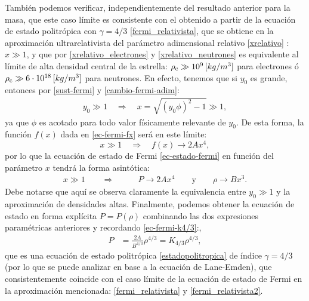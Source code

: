 También podemos verificar, independientemente del resultado anterior para la masa, que este caso límite es consistente con el obtenido a partir de la ecuación de estado politrópica con $\gamma=4/3$ \eqref{fermi_relativista}, que se obtiene en la aproximación ultrarelativista del parámetro adimensional relativo \eqref{xrelativo} : $x\gg1$, y que por \eqref{xrelativo_electrones} y \eqref{xrelativo_neutrones} es equivalente al límite de alta densidad central de la estrella: $\rho_{\rm c}\gg10^{9}\,[kg/m^3]$ para electrones ó $\rho_{\rm c}\gg6\cdot10^{18}\,[kg/m^3]$ para neutrones. En efecto,  tenemos que si $y_0$ es grande, entonces por \eqref{sust-fermi} y \eqref{cambio-fermi-adim}:
\begin{align}
y_0\gg 1\quad\Rightarrow\quad x=\sqrt{(y_0\phi)^2-1}\gg1,
\end{align}
ya que $\phi$ es acotado para todo valor físicamente relevante de $y_0$. De esta forma,  la función $f(x)$ dada en \eqref{ec-fermi-fx} será en este límite:
\begin{equation}
 x\gg1\quad\Rightarrow\quad f(x)\to 2Ax^4,
\end{equation}
por lo que la ecuación de estado de Fermi \eqref{ec-estado-fermi} en función del parámetro $x$ tendrá la forma asintótica:
\begin{align}
 x\gg 1\qquad\Rightarrow\qquad &P\to 2Ax^4\qquad\text{y} \qquad\rho\to Bx^3.
\end{align}
Debe notarse que aquí se observa claramente la equivalencia entre $y_0\gg 1$ y la aproximación de densidades altas. Finalmente, podemos obtener la ecuación de estado en forma explícita $P=P(\rho)$ combinando las dos expresiones paramétricas anteriores y recordando \eqref{ec-fermi-k4/3}:,
\begin{align}
 P&=\frac{2A}{B^{4/3}}\rho^{4/3}=K_{4/3}\rho^{4/3},
\end{align}
que es una ecuación de estado politrópica \eqref{estadopolitropica} de índice $\gamma=4/3$ (por lo que se puede analizar en base a la ecuación de Lane-Emden), que consistentemente coincide con el caso límite de la ecuación de estado de Fermi en la aproximación mencionada: \eqref{fermi_relativista} y \eqref{fermi_relativista2}.

